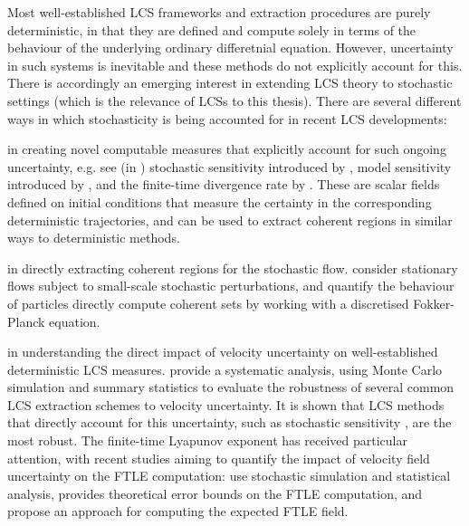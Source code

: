 Most well-established LCS frameworks and extraction procedures are purely deterministic, in that they are defined and compute solely in terms of the behaviour of the underlying ordinary differetnial equation.
However, uncertainty in such systems is inevitable and these methods do not explicitly account for this.
There is accordingly an emerging interest \citep{Balasuriya_2020_StochasticApproachesLagrangian,anymore?} in extending LCS theory to stochastic settings (which is the relevance of LCSs to this thesis).
There are several different ways in which stochasticity is being accounted for in recent LCS developments:
\begin{romanate}
	\item in creating novel computable measures that explicitly account for such ongoing uncertainty, e.g. see (in ) stochastic sensitivity introduced by \citet{Balasuriya_2020_StochasticSensitivityComputable}, model sensitivity introduced by \citet{KaszasHaller_2020_UniversalUpperEstimate}, and the finite-time divergence rate by \citet{BranickiUda_2023_PathBasedDivergenceRates}.
	These are scalar fields defined on initial conditions that measure the certainty in the corresponding deterministic trajectories, and can be used to extract coherent regions in similar ways to deterministic methods.

	\item in directly extracting coherent regions for the stochastic flow.
	\citet{BalasuriyaGottwald_2018_EstimatingStableUnstable} consider stationary flows subject to small-scale stochastic perturbations, and quantify the behaviour of particles
	\citet{DennerEtAl_2016_ComputingCoherentSets} directly compute coherent sets by working with a discretised Fokker-Planck equation.

	\item in understanding the direct impact of velocity uncertainty on well-established deterministic LCS measures.
	\citet{BadzaEtAl_2023_HowSensitiveAre} provide a systematic analysis, using Monte Carlo simulation and summary statistics to evaluate the robustness of several common LCS extraction schemes to velocity uncertainty.
	It is shown that LCS methods that directly account for this uncertainty, such as stochastic sensitivity \citep{Balasuriya_2020_StochasticSensitivityComputable}, are the most robust.
	The finite-time Lyapunov exponent has received particular attention, with recent studies aiming to quantify the impact of velocity field uncertainty on the FTLE computation: \citet{GuoEtAl_2016_FiniteTimeLyapunovExponents} use stochastic simulation and statistical analysis, \citet{Balasuriya_2020_UncertaintyFinitetimeLyapunov} provides theoretical error bounds on the FTLE computation, and \citet{YouLeung_2021_ComputingFiniteTime} propose an approach for computing the expected FTLE field.

\end{romanate}
